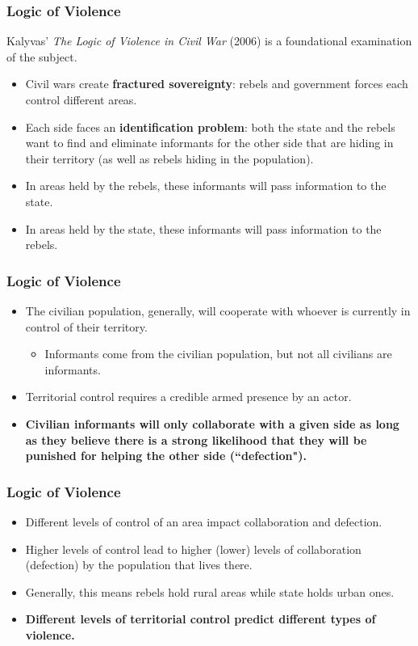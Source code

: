 \documentclass[handout]{beamer}
\begin{document}
\begin{frame} 
	\frametitle{\LARGE{Logic of Violence}}
Kalyvas' \textit{The Logic of Violence in Civil War} (2006) is a foundational examination of the subject.
	\begin{itemize}
		\item Civil wars create \textbf{fractured sovereignty}: rebels and government forces each control different areas. \pause
		\item Each side faces an \textbf{identification problem}: both the state and the rebels want to find and eliminate informants for the other side that are hiding in their territory (as well as rebels hiding in the population). \pause
		\item In areas held by the rebels, these informants will pass information to the state.
		\item In areas held by the state, these informants will pass information to the rebels. 
	\end{itemize}
\end{frame}

\begin{frame} 
	\frametitle{\LARGE{Logic of Violence}}
	\begin{itemize}
		\item The civilian population, generally, will cooperate with whoever is currently in control of their territory. \pause
		\begin{itemize}
			\item Informants come from the civilian population, but not all civilians are informants. \pause
		\end{itemize}
		\item Territorial control requires a credible armed presence by an actor.
		\item \textbf{Civilian informants will only collaborate with a given side as long as they believe there is a strong likelihood that they will be punished for helping the other side (``defection").}
	\end{itemize}
\end{frame}

\begin{frame} 
	\frametitle{\LARGE{Logic of Violence}}
	\begin{itemize}
		\item Different levels of control of an area impact collaboration and defection. \pause
		\item Higher levels of control lead to higher (lower) levels of collaboration (defection) by the population that lives there. \pause
		\item Generally, this means rebels hold rural areas while state holds urban ones. \pause
		\item \textbf{Different levels of territorial control predict different types of violence.}
	\end{itemize}
\end{frame}
\end{document}
